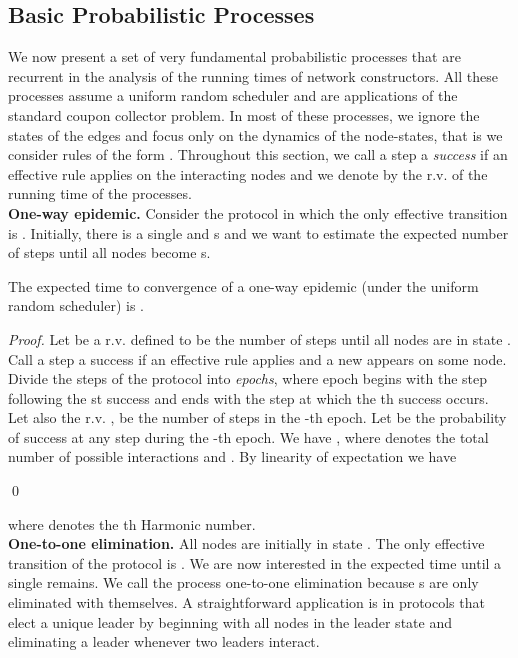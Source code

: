 \documentclass[oribibl, 11pt]{llncs}
\begin{document}
\subsection{Basic Probabilistic Processes}
\label{sec:basic-processes}
 
We now present a set of very fundamental probabilistic processes that are recurrent in the analysis of the running times of network constructors. All these processes assume a uniform random scheduler and are applications of the standard coupon collector problem. In most of these processes, we ignore the states of the edges and focus only on the dynamics of the node-states, that is we consider rules of the form . Throughout this section, we call a step a \emph{success} if an effective rule applies on the interacting nodes and we denote by  the r.v. of the running time of the processes.\\

\noindent\textbf{One-way epidemic.} Consider the protocol in which the only effective transition is . Initially, there is a single  and  s and we want to estimate the expected number of steps until all nodes become s.

\begin{proposition} \label{pro:one-way-ep}
The expected time to convergence of a one-way epidemic (under the uniform random scheduler) is .
\end{proposition}
\begin{proof}
Let  be a r.v. defined to be the number of steps until all  nodes are in state . Call a step a success if an effective rule applies and a new  appears on some node. Divide the steps of the protocol into \emph{epochs}, where epoch  begins with the step following the st success and ends with the step at which the th success occurs. Let also the r.v. ,  be the number of steps in the -th epoch. Let  be the probability of success at any step during the -th epoch. We have , where  denotes the total number of possible interactions and . By linearity of expectation we have 

\qed
\end{proof}
where  denotes the th Harmonic number.\\

\noindent\textbf{One-to-one elimination.} All nodes are initially in state . The only effective transition of the protocol is . We are now interested in the expected time until a single  remains. We call the process one-to-one elimination because s are only eliminated with themselves. A straightforward application is in protocols that elect a unique leader by beginning with all nodes in the leader state and eliminating a leader whenever two leaders interact.
\end{document}
